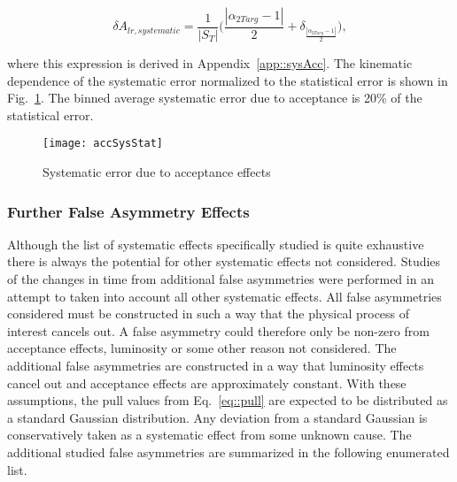 \begin{equation}
  \delta A_{lr,systematic} =
  \frac{1}{|S_T|}
  \Big(\frac{|\alpha_{2Targ}-1|}{2}
  + \delta_{\frac{|\alpha_{2Targ}-1|}{2}} \Big),
\end{equation}

\noindent
where this expression is derived in Appendix~\ref{app::sysAcc}.  The kinematic
dependence of the systematic error normalized to the statistical error is shown
in Fig.~\ref{fig::accSysStat}.  The binned average systematic error due to
acceptance is 20\% of the statistical error.

\begin{figure}[h!t]
  \begin{center}
    \texttt{[image: accSysStat]}
    \caption{Systematic error due to acceptance effects}
    \label{fig::accSysStat}
  \end{center}
\end{figure}

\subsubsection{Further False Asymmetry Effects}
Although the list of systematic effects specifically studied is quite exhaustive
there is always the potential for other systematic effects not considered.
Studies of the changes in time from additional false asymmetries were performed
in an attempt to taken into account all other systematic effects.  All false
asymmetries considered must be constructed in such a way that the physical
process of interest cancels out.  A false asymmetry could therefore only be
non-zero from acceptance effects, luminosity or some other reason not
considered.  The additional false asymmetries are constructed in a way that
luminosity effects cancel out and acceptance effects are approximately constant.
With these assumptions, the pull values from Eq.~\ref{eq::pull} are expected to
be distributed as a standard Gaussian distribution.  Any deviation from a
standard Gaussian is conservatively taken as a systematic effect from some
unknown cause.  The additional studied false asymmetries are summarized in the
following enumerated list.

